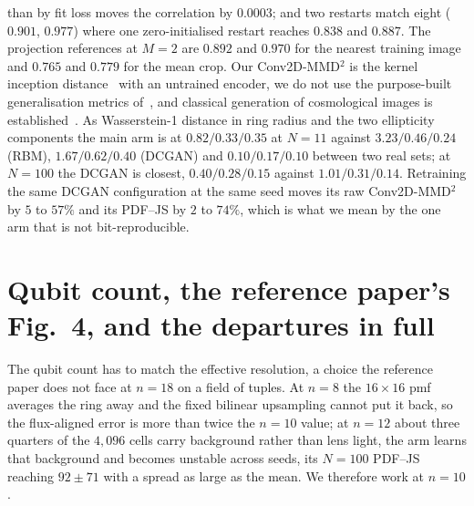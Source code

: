 \documentclass{article}
\begin{document}
than by fit loss moves the correlation by $0.0003$; and two restarts match eight ($0.901$, $0.977$)
where one zero-initialised restart reaches $0.838$ and $0.887$. The projection references at $M{=}2$
are $0.892$ and $0.970$ for the nearest training image and $0.765$ and $0.779$ for the mean crop. Our Conv2D-MMD$^2$ is
the kernel inception distance~\cite{binkowski_2018_demystifying} with an untrained encoder, we do not
use the purpose-built generalisation metrics of~\cite{gili_2024_generalization}, and classical
generation of cosmological images is established~\cite{mustafa_2019_cosmogan}. As Wasserstein-1
distance in ring radius and the two ellipticity components the main arm is at
$0.82 / 0.33 / 0.35$ at $N{=}11$ against $3.23 / 0.46 / 0.24$ (RBM), $1.67 / 0.62 / 0.40$ (DCGAN) and
$0.10 / 0.17 / 0.10$ between two real sets; at $N{=}100$ the DCGAN is closest, $0.40 / 0.28 / 0.15$
against $1.01 / 0.31 / 0.14$. Retraining the same DCGAN configuration at the same seed moves its raw
Conv2D-MMD$^2$ by $5$ to $57\%$ and its PDF--JS by $2$ to $74\%$, which is what we mean by the one
arm that is not bit-reproducible.

\section{\texorpdfstring{Qubit count, the reference paper's Fig.~4, and the departures in full}{Qubit count, the reference paper's Fig. 4, and the departures in full}}
\label{app:nsweep}

The qubit count has to match the effective resolution, a choice the reference paper does not face at
$n=18$ on a field of tuples. At $n=8$ the $16\times16$ pmf averages the ring away and the fixed
bilinear upsampling cannot put it back, so the flux-aligned error is more than twice the $n=10$
value; at $n=12$ about three quarters of the $4{,}096$ cells carry background rather than lens light,
the arm learns that background and becomes unstable across seeds, its $N{=}100$ PDF--JS reaching
$92 \pm 71$ with a spread as large as the mean. We therefore work at $n=10$.
\end{document}
